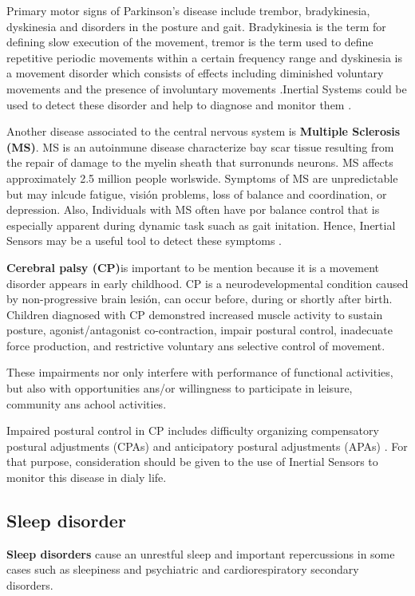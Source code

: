 Primary motor signs of Parkinson’s disease include trembor, bradykinesia, dyskinesia and disorders in the posture and gait. Bradykinesia is the term for defining slow execution of the movement, tremor is the term used to define repetitive periodic movements within a certain frequency range and dyskinesia is a movement disorder which consists of effects including diminished voluntary movements and the presence of involuntary movements .Inertial Systems could be used to detect these disorder and help to diagnose and monitor them \cite{A.Olivares2013}.

Another disease associated to the central nervous system is \textbf{Multiple Sclerosis (MS)}. MS is an autoinmune disease characterize bay scar tissue resulting from the repair of damage to the myelin sheath that surronunds neurons. MS affects approximately 2.5 million people worlswide. Symptoms of MS are unpredictable but may inlcude fatigue, visión problems, loss of balance and coordination, or depression. Also, Individuals with MS often have por balance control that is especially apparent during dynamic task suach as gait initation. Hence, Inertial Sensors may be a useful tool to detect these symptoms \cite{Jebb2008}.


\textbf{Cerebral  palsy (CP)}is important to be mention  because it is a movement disorder appears in early childhood. CP is a neurodevelopmental condition caused by non-progressive brain lesión, can occur before, during or shortly after birth. Children diagnosed with CP demonstred increased muscle activity to sustain posture, agonist/antagonist co-contraction, impair postural control, inadecuate force production, and restrictive voluntary ans selective control of movement\cite{Gay2011}.

These impairments nor only interfere with performance of functional activities, but also with opportunities  ans/or willingness to participate in leisure, community ans achool activities.

Impaired postural control in CP includes difficulty organizing compensatory postural adjustments (CPAs) and anticipatory postural adjustments (APAs) \cite{Gay2011}. For that purpose,  consideration should be given to the use of Inertial Sensors to monitor this disease in dialy life.

\subsection{Sleep disorder}
\textbf{Sleep disorders} cause an unrestful sleep and important repercussions in some cases such as sleepiness and psychiatric and cardiorespiratory secondary disorders\cite{SanchezDaniel}. 

